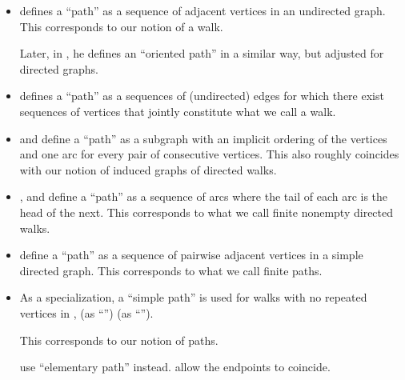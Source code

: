 \begin{remark}
\begin{thmenum}
\begin{itemize}
      \Textcite[191]{Erickson2019Algorithms} also uses this definition, however his notion of walk is different --- see above.

      \item \Textcite[363]{Knuth1997ArtVol1} defines a \enquote{path} as a sequence of adjacent vertices in an undirected graph. This corresponds to our notion of a walk.

      Later, in \cite[373]{Knuth1997ArtVol1}, he defines an \enquote{oriented path} in a similar way, but adjusted for directed graphs.

      \item \Textcite[def. 10.4.1]{Rosen2019DiscreteMathematics} defines a \enquote{path} as a sequences of (undirected) edges for which there exist sequences of vertices that jointly constitute what we call a walk.

      \item \Textcite[6]{Diestel2017GraphTheory} and \textcite[4]{Bollobás1998ModernGraphTheory} define a \enquote{path} as a subgraph with an implicit ordering of the vertices and one arc for every pair of consecutive vertices. This also roughly coincides with our notion of induced graphs of directed walks.

      \item \Textcite[def. 1.1.3]{Knauer2019AlgebraicGraphTheory}, \textcite[13]{GondranMinoux1984GraphsAndAlgorithms} and \textcite[11]{Мирчев2001Графи} define a \enquote{path} as a sequence of arcs where the tail of each arc is the head of the next. This corresponds to what we call finite nonempty directed walks.

      \item \Textcite[278]{БелоусовТкачёв2004ДискретнаяМатематика} define a \enquote{path} as a sequence of pairwise adjacent vertices in a simple directed graph. This corresponds to what we call finite paths.

      \item As a specialization, a \enquote{simple path} is used for walks with no repeated vertices in
      \cite[def. 1.1.3]{Knauer2019AlgebraicGraphTheory},
      \cite[279]{БелоусовТкачёв2004ДискретнаяМатематика} (as \enquote{})
      \cite[11]{Мирчев2001Графи} (as \enquote{}).

      This corresponds to our notion of paths.

      \Textcite[32]{GondranMinoux1984GraphsAndAlgorithms} use \enquote{elementary path} instead. \Textcite[279]{БелоусовТкачёв2004ДискретнаяМатематика} allow the endpoints to coincide.


\end{itemize}
\end{thmenum}
\end{remark}
